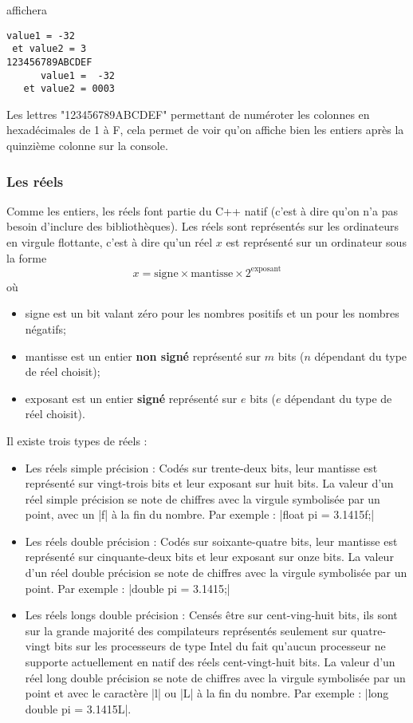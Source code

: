 affichera

\begin{verbatim}
value1 = -32
 et value2 = 3
123456789ABCDEF
      value1 =  -32
   et value2 = 0003
\end{verbatim}

Les lettres "123456789ABCDEF" permettant de numéroter les colonnes en hexadécimales de 1 à F, cela permet de voir
qu'on affiche bien les entiers après la quinzième colonne sur la console.

\subsubsection{Les réels}

Comme les entiers, les réels font partie du C++ natif (c'est à dire qu'on n'a pas besoin d'inclure des bibliothèques).
Les réels sont représentés sur les ordinateurs en virgule flottante, c'est à dire qu'un réel $x$ est représenté sur
un ordinateur sous la forme
\[
x = \mbox{signe}\times\mbox{mantisse}\times2^{\mbox{exposant}}
\]
où
\begin{itemize}
  \item signe est un bit valant zéro pour les nombres positifs et un pour les nombres négatifs;
  \item mantisse est un entier \textbf{non signé} représenté sur $m$ bits ($n$ dépendant du type de réel choisit);
  \item exposant est un entier \textbf{signé} représenté sur $e$ bits ($e$ dépendant du type de réel choisit).
\end{itemize}

Il existe trois  types de réels :
\begin{itemize}
  \item Les réels simple précision : Codés sur trente-deux bits, leur mantisse est représenté sur vingt-trois bits et leur exposant sur huit bits. La valeur d'un réel simple précision se note de chiffres avec la virgule symbolisée par un point,
  avec un |f| à la fin du nombre. Par exemple : |float pi = 3.1415f;|
  \item Les réels double précision : Codés sur soixante-quatre bits, leur mantisse est représenté sur cinquante-deux bits
  et leur exposant sur onze bits. La valeur d'un réel double précision se note de chiffres avec la virgule symbolisée par un point. Par exemple : |double pi = 3.1415;|
  \item Les réels longs double précision : Censés être sur cent-ving-huit bits, ils sont sur la grande majorité des compilateurs représentés seulement sur quatre-vingt bits sur les processeurs de type Intel du fait qu'aucun processeur ne supporte  actuellement en natif des réels cent-vingt-huit bits. La valeur d'un réel long double précision se note de chiffres avec la virgule symbolisée par un point et avec le caractère |l| ou |L| à la fin du nombre. Par exemple : |long double pi = 3.1415L|.
\end{itemize}

